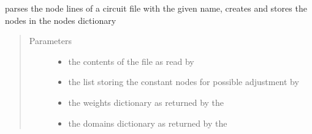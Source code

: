 \documentclass[letterpaper,10pt,english,openany,oneside]{sphinxmanual}
\begin{document}
\begin{fulllineitems}
\begin{fulllineitems}
\begin{quote}
\begin{description}
\end{description}\end{quote}

\end{fulllineitems}


\begin{fulllineitems}
\label{\detokenize{index:parser.Parser.parseNodes}}
parses the node lines of a circuit file with the given name, creates and stores the nodes in the nodes dictionary
\begin{quote}\begin{description}
\item[{Parameters}] \leavevmode\begin{itemize}
\item {} 
 \textendash{} the contents of the file as read by {\hyperref[\detokenize{index:parser.Parser.parseCircuit}]{}}

\item {} 
 \textendash{} the list storing the constant nodes for possible adjustment by {\hyperref[\detokenize{index:parser.Parser.adjustConstNodes}]{}}

\item {} 
 \textendash{} the weights dictionary as returned by the {\hyperref[\detokenize{index:parser.Parser.parseWeights}]{}}

\item {} 
 \textendash{} the domains dictionary as returned by the {\hyperref[\detokenize{index:parser.Parser.parseWeights}]{}}

\end{itemize}

\end{description}\end{quote}


\end{fulllineitems}
\end{fulllineitems}
\end{document}
